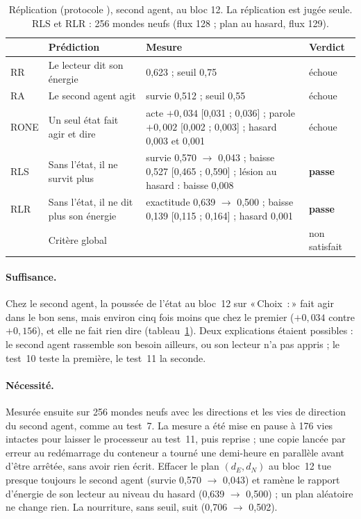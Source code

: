 \documentclass[11pt,a4paper]{article}
\newcommand{\passe}{\textbf{passe}}
\newcommand{\Choix}{«\,Choix~:\,»}
\newcommand{\dE}{d_{E}}
\newcommand{\dN}{d_{N}}
\newcommand{\code}[1]{\texttt{\detokenize{#1}}}
\begin{document}
\begin{table}[t]
\centering
\caption{Réplication (protocole \code{4e10a6c}), second agent, au bloc 12. La
réplication est jugée seule. RLS et RLR : 256 mondes neufs (flux 128 ; plan au
hasard, flux 129).}
\label{tab-repl}
\small
\begin{tabularx}{\textwidth}{@{}l >{\raggedright\arraybackslash}p{3.6cm} X l@{}}
\toprule
& Prédiction & Mesure & Verdict \\
\midrule
RR & Le lecteur dit son énergie & 0,623 ; seuil 0,75 & échoue \\
RA & Le second agent agit & survie 0,512 ; seuil 0,55 & échoue \\
RONE & Un seul état fait agir et dire & acte $+0,034$ [0,031 ; 0,036] ; parole $+0,002$ [0,002 ; 0,003] ; hasard 0,003 et 0,001 & échoue \\
RLS & Sans l'état, il ne survit plus & survie 0,570 $\to$ 0,043 ; baisse 0,527 [0,465 ; 0,590] ; lésion au hasard : baisse 0,008 & \passe \\
RLR & Sans l'état, il ne dit plus son énergie & exactitude 0,639 $\to$ 0,500 ; baisse 0,139 [0,115 ; 0,164] ; hasard 0,001 & \passe \\
\midrule
& Critère global & & non satisfait \\
\bottomrule
\end{tabularx}
\end{table}

\paragraph{Suffisance.} Chez le second agent, la poussée de l'état au bloc~12 sur
\Choix{} fait agir dans le bon sens, mais environ cinq fois moins que chez le premier
($+0,034$ contre $+0,156$), et elle ne fait rien dire (tableau~\ref{tab-repl}). Deux
explications étaient possibles : le second agent rassemble son besoin ailleurs, ou
son lecteur n'a pas appris ; le test~10 teste la première, le test~11 la seconde.

\paragraph{Nécessité.} Mesurée ensuite sur 256 mondes neufs avec les directions et
les vies de direction du second agent, comme au test~7. La mesure a été mise en
pause à 176 vies intactes pour laisser le processeur au test~11, puis reprise ; une
copie lancée par erreur au redémarrage du conteneur a tourné une demi-heure en
parallèle avant d'être arrêtée, sans avoir rien écrit. Effacer le plan $(\dE,\dN)$
au bloc~12 tue presque toujours le second agent (survie 0,570 $\to$ 0,043) et ramène
le rapport d'énergie de son lecteur au niveau du hasard (0,639 $\to$ 0,500) ; un plan
aléatoire ne change rien. La nourriture, sans seuil, suit (0,706 $\to$ 0,502).
\end{document}
